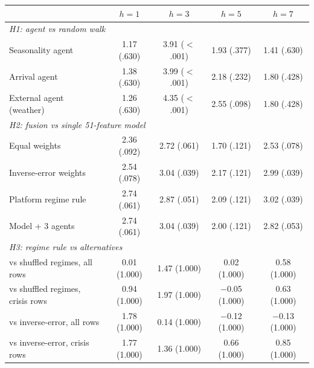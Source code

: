 \begin{tabular}{lcccc}
\toprule
 & $h{=}1$ & $h{=}3$ & $h{=}5$ & $h{=}7$\\
\midrule
\multicolumn{5}{l}{\emph{H1: agent vs random walk}}\\
Seasonality agent & 1.17 (.630) & 3.91 ($<$.001) & 1.93 (.377) & 1.41 (.630)\\
Arrival agent & 1.38 (.630) & 3.99 ($<$.001) & 2.18 (.232) & 1.80 (.428)\\
External agent (weather) & 1.26 (.630) & 4.35 ($<$.001) & 2.55 (.098) & 1.80 (.428)\\
\multicolumn{5}{l}{\emph{H2: fusion vs single 51-feature model}}\\
Equal weights & 2.36 (.092) & 2.72 (.061) & 1.70 (.121) & 2.53 (.078)\\
Inverse-error weights & 2.54 (.078) & 3.04 (.039) & 2.17 (.121) & 2.99 (.039)\\
Platform regime rule & 2.74 (.061) & 2.87 (.051) & 2.09 (.121) & 3.02 (.039)\\
Model + 3 agents & 2.74 (.061) & 3.04 (.039) & 2.00 (.121) & 2.82 (.053)\\
\multicolumn{5}{l}{\emph{H3: regime rule vs alternatives}}\\
vs shuffled regimes, all rows & 0.01 (1.000) & 1.47 (1.000) & 0.02 (1.000) & 0.58 (1.000)\\
vs shuffled regimes, crisis rows & 0.94 (1.000) & 1.97 (1.000) & $-$0.05 (1.000) & 0.63 (1.000)\\
vs inverse-error, all rows & 1.78 (1.000) & 0.14 (1.000) & $-$0.12 (1.000) & $-$0.13 (1.000)\\
vs inverse-error, crisis rows & 1.77 (1.000) & 1.36 (1.000) & 0.66 (1.000) & 0.85 (1.000)\\
\bottomrule
\end{tabular}
